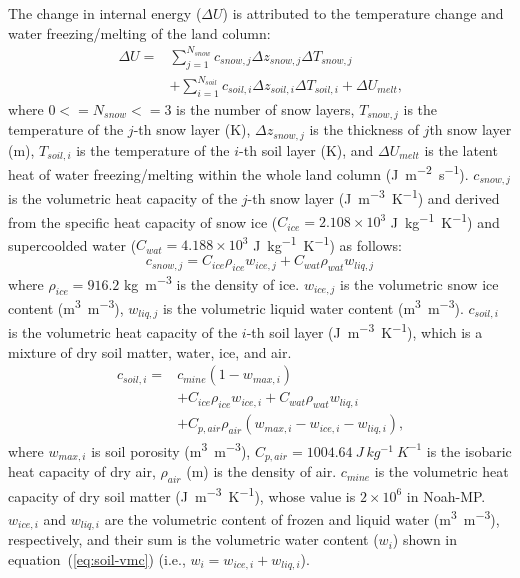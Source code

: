 \documentclass[essd]{copernicus}
\begin{document}
The change in internal energy ($\Delta U$) is attributed to the temperature
change and water freezing/melting of the land column:
\begin{equation}
    \begin{split}
        \Delta U = & \sum_{j=1}^{N_{snow}} c_{snow,j} \Delta z_{snow,j} \Delta T_{snow,j} \\
        & + \sum_{i=1}^{N_{soil}} c_{soil,i} \Delta z_{soil,i} \Delta T_{soil,i}
        + \Delta U_{melt} \text{,}
    \end{split}
\end{equation}
where $0<=N_{snow}<=3$ is the number of snow layers, $T_{snow,j}$ is the
temperature of the $j$-th snow layer (\unit{K}), $\Delta z_{snow,j}$ is the
thickness of $j$th snow layer (\unit{m}), $T_{soil,i}$ is the temperature of the
$i$-th soil layer (\unit{K}), and $\Delta U_{melt}$ is the latent heat of water
freezing/melting within the whole land column (\unit{J~m^{-2}~s^{-1}}).
$c_{snow,j}$ is the volumetric heat capacity of the $j$-th snow layer
(\unit{J~m^{-3}~K^{-1}}) and derived from the specific heat capacity of snow ice
($C_{ice} = 2.108 \times 10^3$ \unit{J~kg^{-1}~K^{-1}}) and supercoolded water
($C_{wat} = 4.188 \times 10^3$ \unit{J~kg^{-1}~K^{-1}}) as follows:
\begin{equation}
    c_{snow,j} = C_{ice} \rho_{ice} w_{ice,j} + C_{wat} \rho_{wat} w_{liq,j}
\end{equation}
where $\rho_{ice} = 916.2$ \unit{kg~m^{-3}} is the density of ice. $w_{ice,j}$
is the volumetric snow ice content (\unit{m^3~m^{-3}}), $w_{liq,j}$ is the
volumetric liquid water content (\unit{m^3~m^{-3}}). $c_{soil,i}$ is the
volumetric heat capacity of the $i$-th soil layer (\unit{J~m^{-3}~K^{-1}}), which
is a mixture of dry soil matter, water, ice, and air.
\begin{equation}
    \begin{split}
        c_{soil,i} = & c_{mine} (1 - w_{max,i}) \\
        & + C_{ice} \rho_{ice} w_{ice,i} + C_{wat} \rho_{wat} w_{liq,i} \\
        & + C_{p,air} \rho_{air} (w_{max,i} - w_{ice,i} - w_{liq,i}) \text{,}
    \end{split}
\end{equation}
where $w_{max,i}$ is soil porosity (\unit{m^3~m^{-3}}), $C_{p,air} =
1004.64~\unit{J~kg^{-1}~K^{-1}}$ is the isobaric heat capacity of dry air,
$\rho_{air}$ (\unit{m}) is the density of air. $c_{mine}$ is the volumetric heat
capacity of dry soil matter (\unit{J~m^{-3}~K^{-1}}), whose value is
$2\times10^6$ in Noah-MP. $w_{ice,i}$ and $w_{liq,i}$ are the volumetric content
of frozen and liquid water (\unit{m^3~m^{-3}}), respectively, and their sum is
the volumetric water content ($w_{i}$) shown in equation~(\ref{eq:soil-vmc})
(i.e., $w_{i} = w_{ice,i} + w_{liq,i}$).
\end{document}
